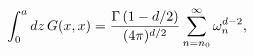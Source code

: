 \begin{equation}
\int_{0}^{a}dz\,G(x,x)=
{\Gamma\left(1-d/2\right)\over(4\pi)^{d/2}}
\sum_{n=n_0}^{\infty}\omega_{n}^{d-2},
\end{equation}


